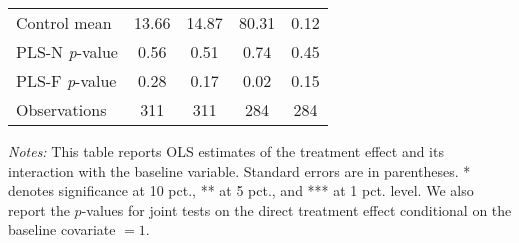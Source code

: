 \begin{table}[ht]
{\begin{threeparttable}
\begin{tabular}{l*{4}{c}}
Control mean    &    13.66         &    14.87         &    80.31         &     0.12         \\
PLS-N \emph{p}-value&     0.56         &     0.51         &     0.74         &     0.45         \\
PLS-F \emph{p}-value&     0.28         &     0.17         &     0.02         &     0.15         \\
Observations    &      311         &      311         &      284         &      284         \\
\bottomrule \end{tabular} \begin{tablenotes}[flushleft] \footnotesize \item \emph{Notes:} This table reports OLS estimates of the treatment effect and its interaction with the baseline variable. Standard errors are in parentheses. * denotes significance at 10 pct., ** at 5 pct., and *** at 1 pct. level. We also report the \(p\)-values for joint tests on the direct treatment effect conditional on the baseline covariate $= 1$. \end{tablenotes} \end{threeparttable} } \end{table}

